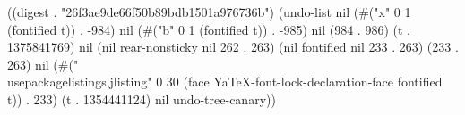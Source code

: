 
((digest . "26f3ae9de66f50b89bdb1501a976736b") (undo-list nil (#("x" 0 1 (fontified t)) . -984) nil (#("b" 0 1 (fontified t)) . -985) nil (984 . 986) (t . 1375841769) nil (nil rear-nonsticky nil 262 . 263) (nil fontified nil 233 . 263) (233 . 263) nil (#("\\usepackage{listings,jlisting}" 0 30 (face YaTeX-font-lock-declaration-face fontified t)) . 233) (t . 1354441124) nil undo-tree-canary))
